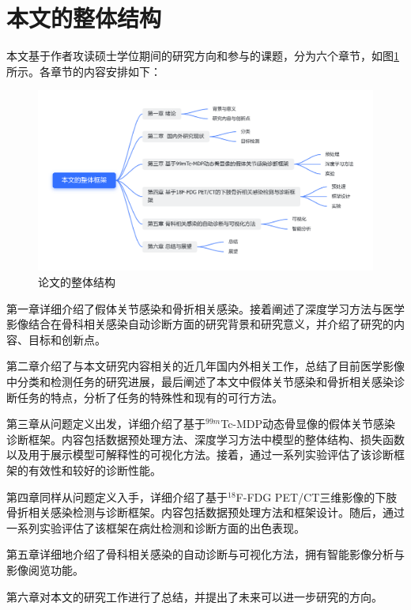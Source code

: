 \section{本文的整体结构}

本文基于作者攻读硕士学位期间的研究方向和参与的课题，分为六个章节，如图\ref{fig:chap01_structure}所示。各章节的内容安排如下：

\begin{figure}[htbp]
  \centering
  \includegraphics[width=\textwidth]{figures/chap01_structure_light.png}
  \caption{论文的整体结构}
  \label{fig:chap01_structure}
\end{figure}

第一章详细介绍了假体关节感染和骨折相关感染。接着阐述了深度学习方法与医学影像结合在骨科相关感染自动诊断方面的研究背景和研究意义，并介绍了研究的内容、目标和创新点。

第二章介绍了与本文研究内容相关的近几年国内外相关工作，总结了目前医学影像中分类和检测任务的研究进展，最后阐述了本文中假体关节感染和骨折相关感染诊断任务的特点，分析了任务的特殊性和现有的可行方法。

第三章从问题定义出发，详细介绍了基于\(^{99m}\)Tc-MDP动态骨显像的假体关节感染诊断框架。内容包括数据预处理方法、深度学习方法中模型的整体结构、损失函数以及用于展示模型可解释性的可视化方法。接着，通过一系列实验评估了该诊断框架的有效性和较好的诊断性能。

第四章同样从问题定义入手，详细介绍了基于\(^{18}\)F-FDG PET/CT三维影像的下肢骨折相关感染检测与诊断框架。内容包括数据预处理方法和框架设计。随后，通过一系列实验评估了该框架在病灶检测和诊断方面的出色表现。

第五章详细地介绍了骨科相关感染的自动诊断与可视化方法，拥有智能影像分析与影像阅览功能。

第六章对本文的研究工作进行了总结，并提出了未来可以进一步研究的方向。











